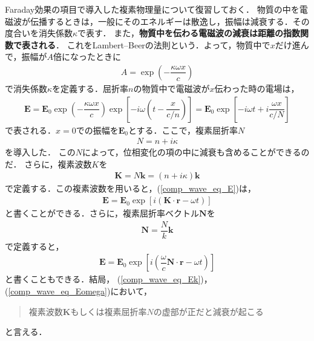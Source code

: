 Faraday効果の項目で導入した複素物理量について復習しておく．
物質の中を電磁波が伝播するときは，一般にそのエネルギーは散逸し，振幅は減衰する．その度合いを消失係数$\kappa$で表す．
また，\textbf{物質中を伝わる電磁波の減衰は距離の指数関数で表される}．
これをLambert–Beerの法則という．よって，物質中で$x$だけ進んで，振幅が$A$倍になったときに
\begin{align}
  A=\exp\left(-\dfrac{\kappa\omega{x}}{c}\right)
\end{align}
で消失係数$\kappa$を定義する．屈折率$n$の物質中で電磁波が$x$伝わった時の電場は，
\begin{align}
  \boldsymbol{E}=\boldsymbol{E}_0\exp\left(-\dfrac{\kappa\omega{x}}{c}\right)\exp\left[-i\omega\left(t-\dfrac{x}{c/n}\right)\right] = \boldsymbol{E}_0\exp\left[-i\omega{t}+i\dfrac{\omega{x}}{c/N}\right]\label{comp_wave_eq_E}
\end{align}
で表される．$x=0$での振幅を$\boldsymbol{E}_0$とする．ここで，複素屈折率$N$
\begin{align}
  N=n+i\kappa
\end{align}
を導入した．
この$N$によって，位相変化の項の中に減衰も含めることができるのだ．
さらに，複素波数$K$を
\begin{align}
  \boldsymbol{K}=N\boldsymbol{k}=(n+i\kappa)\boldsymbol{k}
\end{align}
で定義する．この複素波数を用いると，(\ref{comp_wave_eq_E})は，
\begin{align}
  \boldsymbol{E}=\boldsymbol{E}_0\exp\left[i\left(\boldsymbol{K}\cdot\boldsymbol{r}-\omega{}t\right)\right]\label{comp_wave_eq_Ek}
\end{align}
と書くことができる．さらに，複素屈折率ベクトル$\boldsymbol{N}$を
\begin{align}
  \boldsymbol{N}=\dfrac{N}{k}\boldsymbol{k}\label{comp_wave_eq_def_N}
\end{align}
で定義すると，
\begin{align}
  \boldsymbol{E}=\boldsymbol{E}_0\exp\left[i\left(\dfrac{\omega}{c}\boldsymbol{N}\cdot\boldsymbol{r}-\omega{}t\right)\right]\label{comp_wave_eq_Eomega}
\end{align}
と書くこともできる．結局，
(\ref{comp_wave_eq_Ek})，(\ref{comp_wave_eq_Eomega})において，
\begin{quote}
  複素波数$\boldsymbol{K}$もしくは複素屈折率$N$の虚部が正だと減衰が起こる
\end{quote}
と言える．

